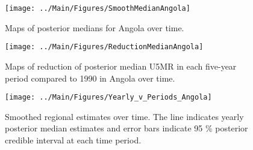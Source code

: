 \documentclass[12pt]{article}\usepackage[]{graphicx}\usepackage[]{color}
\newenvironment{knitrout}{}{} %
\begin{document}
\begin{knitrout}
\color{fgcolor}\begin{figure}[bht]

{\centering \texttt{[image: ../Main/Figures/SmoothMedianAngola]} 

}

\caption[Maps of posterior medians for Angola  over time]{Maps of posterior medians for Angola  over time.}\label{fig:unnamed-chunk-4}
\end{figure}


\end{knitrout}
\begin{knitrout}
\color{fgcolor}\begin{figure}[bht]

{\centering \texttt{[image: ../Main/Figures/ReductionMedianAngola]} 

}

\caption[Maps of reduction of posterior median U5MR in each five-year period compared to 1990 in Angola over time]{Maps of reduction of posterior median U5MR in each five-year period compared to 1990 in Angola over time.}\label{fig:unnamed-chunk-5}
\end{figure}


\end{knitrout}
\begin{knitrout}
\color{fgcolor}\begin{figure}[bht]

{\centering \texttt{[image: ../Main/Figures/Yearly\_v\_Periods\_Angola]} 

}

\caption[Smoothed regional estimates over time]{Smoothed regional estimates over time. The line indicates yearly posterior median estimates and error bars indicate 95 \% posterior credible interval at each time period.}\label{fig:unnamed-chunk-6}
\end{figure}


\end{knitrout}
\end{document}
